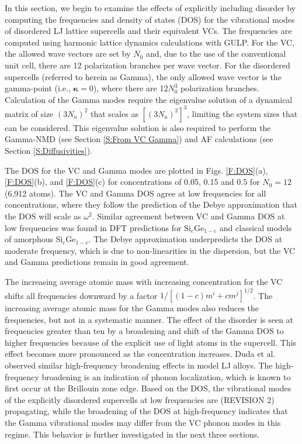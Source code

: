 \documentclass[12pt,twocolumn,iop]{/usr/share/texmf/tex/latex/iop/iopart}[/usr/share/texmf/tex/latex/iop/]
\begin{document}
In this section, we begin to examine the effects of explicitly including 
disorder by computing the frequencies and density of states (DOS)  
for the vibrational modes of disordered LJ lattice supercells and their 
equivalent VCs. The frequencies 
are computed using harmonic lattice dynamics calculations with  
GULP.\cite{gale_general_2003}  For the 
VC, the allowed wave vectors are set by $N_0$ and, due to the use of the 
conventional unit cell, there are 12 
polarization branches per wave vector.  
For the disordered supercells (referred to herein as Gamma),
the only allowed wave vector is the gamma-point (i.e., $\pmb{\kappa}=0$),  
where there are 12$N_0^3$ polarization branches. Calculation of the 
Gamma modes require the eigenvalue solution of a dynamical matrix of size 
$(3N_a)^2$ that scales as $[(3N_a)^2]^3$, limiting the system 
sizes that can be considered. This eigenvalue solution is also 
required to perform the Gamma-NMD (see Section \ref{S:From VC Gamma})  
and AF calculations (see Section \ref{S:Diffusivities}). 

The DOS for the VC and Gamma modes are plotted in Figs. \ref{F:DOS}(a), 
\ref{F:DOS}(b), and \ref{F:DOS}(c) 
for concentrations of 0.05, 0.15 and 0.5 for 
$N_0=12$ (6,912 atoms). The VC and Gamma DOS 
agree at low frequencies for all concentrations, 
where they follow the prediction of the Debye approximation that 
the DOS will scale as $\omega^2$.\cite{ashcroft_solid_1976} 
Similar agreement between VC and Gamma DOS at low frequencies 
was found in DFT predictions 
for Si$_c$Ge$_{1-c}$\cite{garg_role_2011} and 
classical models of amorphous Si$_c$Ge$_{1-c}$.
\cite{bouchard_vibrational_1988} The Debye approximation 
underpredicts the DOS at moderate frequency, which is due to 
non-linearities in the dispersion,\cite{ashcroft_solid_1976} but the 
VC and Gamma predictions remain in good agreement. 

The increasing average atomic  
mass with increasing concentration for the VC shifts all   
frequencies downward by a factor $1/[(1-c)m^i + cm^j]^{1/2}$. 
The increasing average atomic 
mass for the Gamma modes also reduces the frequencies, but not in a 
systematic manner. 
The effect of the disorder is seen at frequencies greater than 
ten by a broadening and shift of the Gamma DOS to higher frequencies 
because of the explicit use of light atoms in the supercell. This effect 
becomes more pronounced as the concentration increases.  
Duda et al. 
observed similar high-frequency broadening effects in model LJ alloys.
\cite{duda_reducing_2011} The high-frequency broadening is an indication 
of phonon localization, which is known to first occur at the 
Brillouin zone edge.\cite{chu_effect_1989} 
Based on the DOS, the vibrational modes of the explicitly disordered 
supercells at low frequencies are (REVISION 2) propagating, while the 
broadening of the DOS at high-frequency indicates that the Gamma 
vibrational modes may differ from the VC phonon modes in this regime. 
This behavior is further investigated in the next three sections. 
\end{document}
